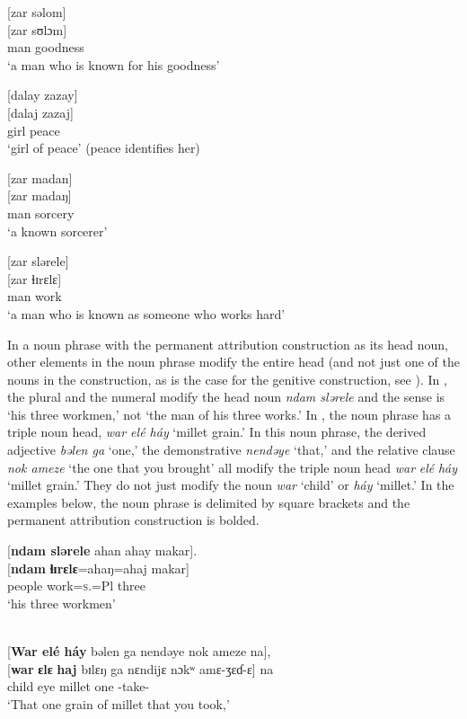 \ea \label{ex:5:88}
{}[zar  səlom]\\
\gll  {}[zar   sʊlɔm]\\
      man    goodness\\
\glt  ‘a man who is known for his goodness’
\z

\ea \label{ex:5:89}
{}[dalay  zazay]\\
\gll  {}[dalaj   zazaj]\\
      girl    peace\\
\glt  ‘girl of peace’ (peace identifies her)
\z

\ea \label{ex:5:90}
{}[zar  madan]\\
\gll  {}[zar   madaŋ]\\
      man    sorcery\\
\glt  ‘a known sorcerer’
\z

\ea \label{ex:5:91}
{}[zar  slərele]\\
\gll  {}[zar   ɬɪrɛlɛ]\\
      man    work\\
\glt  ‘a man who is known as someone who works hard’
\z

In a noun phrase with the permanent attribution construction as its head noun, other elements in the noun phrase modify the entire head (and not just one of the nouns in the construction, as is the case for the genitive construction, see ). In , the plural and the numeral modify the head noun \textit{ndam slərele} and the sense is ‘his three workmen,’ not ‘the man of his three works.’  In , the noun phrase has a triple noun head, \textit{war elé  háy} ‘millet grain.’ In this noun phrase, the derived adjective \textit{bəlen ga} ‘one,’ the demonstrative \textit{nendəye} ‘that,’ and the relative clause \textit{nok ameze}  ‘the one that you brought’ all modify the triple noun head \textit{war} \textit{elé} \textit{háy}  ‘millet grain.’ They do not just modify the noun \textit{war} ‘child’ or \textit{háy} ‘millet.’ In the examples below, the noun phrase is delimited by square brackets and the permanent attribution construction is bolded. 

\ea \label{ex:5:92}
{}[\textbf{ndam  slərele} ahan  ahay  makar].\\
\gll  {}[\textbf{ndam}   \textbf{ɬɪrɛlɛ}=ahaŋ=ahaj   makar]\\
      people  work=\textsc{s}.{\POSS}=Pl  three\\
\glt  ‘his three workmen’
\z

\ea \label{ex:5:93}\\
{}[\textbf{War  elé  háy}  bəlen  ga  nendəye  nok  ameze   na],  \\
\gll  {}[\textbf{war} \textbf{ɛlɛ} \textbf{haj}     bɪlɛŋ   ga    nɛndijɛ    nɔkʷ     amɛ-ʒɛɗ-ɛ] na\\
      child    eye    millet   one   {\ADJ}    {\DEM}      {\twoS}         {\DEP}-take-{\CL}   {\PSP}\\
\glt ‘That one grain of millet that you took,’

